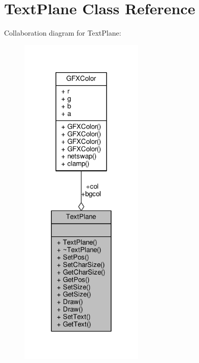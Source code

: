 \hypertarget{classTextPlane}{}\section{Text\+Plane Class Reference}
\label{classTextPlane}


Collaboration diagram for Text\+Plane\+:
\nopagebreak
\begin{figure}[H]
\begin{center}
\leavevmode
\includegraphics[width=168pt]{d3/d2f/classTextPlane__coll__graph}
\end{center}
\end{figure}
